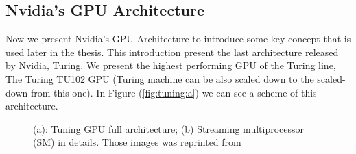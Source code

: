 \subsection{Nvidia's GPU Architecture}
Now we present Nvidia's GPU Architecture to introduce some key concept that is used later in the thesis. This introduction present the last architecture released by Nvidia, Turing. We present the highest performing GPU of the Turing line, The Turing TU102 GPU (Turing machine can be also scaled down to the scaled-down from this one). 
In Figure (\ref{fig:tuning:a}) we can see a scheme of this architecture.
\begin{figure}[h]\label{fig:tuning}
	\hspace*{-4em}
	\hspace{4em}%
	\caption{(a): Tuning GPU full architecture; (b) Streaming multiprocessor (SM) in details. Those images was reprinted from \cite{turing} }
\end{figure}
